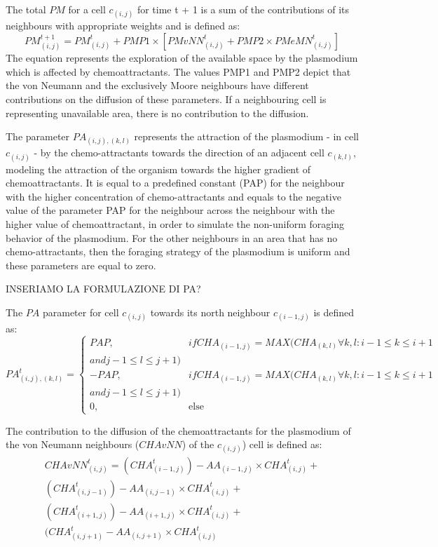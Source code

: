 The total $PM$ for a cell $c_{(i,j)}$ for time t + 1 is a sum of the contributions of its neighbours with appropriate weights and is defined as:
\begin{equation}
PM^{t+1}_{(i, j)} = PM^t_{(i, j)} + PMP1 \times [PMvNN^t_{(i, j)} + PMP2 \times PMeMN^t_{(i, j)}]
\end{equation}
The equation represents the exploration of the available space by the plasmodium which is affected by chemoattractants. The values PMP1 and PMP2 depict that the von Neumann and the exclusively Moore neighbours have different contributions on the diffusion of
these parameters. If a neighbouring cell is representing unavailable area, there is no contribution to the diffusion. 
\par
The parameter $PA_{(i, j),(k,l)}$ represents the attraction of the plasmodium - in cell $c_{(i,j)}$ - by the chemo-attractants towards the direction of an adjacent cell $c_{(k,l)}$, modeling the attraction of the organism towards the higher gradient of chemoattractants. It is equal to a predefined constant (PAP) for the neighbour with the higher concentration of chemo-attractants and equals to the negative value of the parameter PAP for the neighbour across the neighbour with the higher value of chemoattractant, in order to simulate the non-uniform foraging behavior of the plasmodium. For the other neighbours in an area that has no chemo-attractants, then the foraging strategy of the plasmodium is uniform and these parameters are equal to zero.
\par
INSERIAMO LA FORMULAZIONE DI PA?
\par
The $PA$ parameter for cell $c_{(i,j)}$ towards its north neighbour $c_{(i-1,j)}$ is defined as:
\begin{equation}
PA^t_{(i, j),(k,l)}=
\begin{cases} 
PAP, & if CHA_{(i-1, j)} = MAX(CHA_{(k, l)} \forall k, l: i - 1 \leq k \leq i + 1 \\and j - 1 \leq l \leq j+1) \\ 
- PAP, & if CHA_{(i-1, j)} = MAX(CHA_{(k, l)} \forall k, l: i - 1 \leq k \leq i + 1 \\and j - 1 \leq l \leq j+1) \\ 
0, & \mbox{else}
\end{cases}
\end{equation}
\par
The contribution to the diffusion of the chemoattractants for the plasmodium of the von Neumann neighbours ($CHAvNN$) of the $c_{(i,j)}$) cell is defined as:
\begin{equation}
\begin{split}
CHAvNN^t_{(i, j)} = 
(CHA^t_{(i-1, j)}) - AA_{(i-1, j)} \times CHA^t_{(i, j)} +
\\(CHA^t_{(i, j-1)}) - AA_{(i, j-1)} \times CHA^t_{(i, j)} +
\\(CHA^t_{(i+1, j)}) - AA_{(i+1, j)} \times CHA^t_{(i, j)}  +
\\(CHA^t_{(i, j+1)} - AA_{(i, j+1)} \times CHA^t_{(i, j)}
\end{split}
\end{equation}

